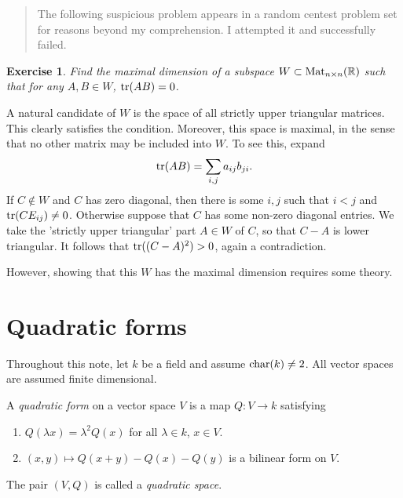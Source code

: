 \documentclass{article}
\newtheorem*{exercise}{Exercise}
\begin{document}
\self

\begin{quote}
    The following suspicious problem appears in a random centest problem set for reasons beyond my comprehension. I attempted it and successfully failed.
\end{quote}

\begin{exercise}
    Find the maximal dimension of a subspace $W\subset \operatorname{Mat}_{n\times n}(\mathbb{R})$ such that for any $A,B\in W$, $\operatorname{tr}(AB)=0$.
\end{exercise}

A natural candidate of $W$ is the space of all strictly upper triangular matrices. This clearly satisfies the condition. Moreover, this space is maximal, in the sense that no other matrix may be included into $W$. To see this, expand
\begin{equation}\label{eq.trAB}
    \operatorname{tr}(AB) = \sum_{i,j} a_{ij}b_{ji}.
\end{equation}
If $C\notin W$ and $C$ has zero diagonal, then there is some $i,j$ such that $i<j$ and $\operatorname{tr}(CE_{ij})\neq 0$. Otherwise suppose that $C$ has some non-zero diagonal entries. We take the 'strictly upper triangular' part $A\in W$ of $C$, so that $C-A$ is lower triangular. It follows that $\operatorname{tr}((C-A)^2)>0$, again a contradiction.

However, showing that this $W$ has the maximal dimension requires some theory.

\section{Quadratic forms}\label{sec.quadform}

Throughout this note, let $k$ be a field and assume $\operatorname{char}(k)\neq 2$. All vector spaces are assumed finite dimensional.

\begin{definition}
    A \emph{quadratic form} on a vector space $V$ is a map $Q:V\to k$ satisfying
    \begin{enumerate}
        \item $Q(\lambda x)=\lambda^2 Q(x)$ for all $\lambda\in k$, $x\in V$.
        \item $(x,y)\mapsto Q(x+y)-Q(x)-Q(y)$ is a bilinear form on $V$.
    \end{enumerate}
    The pair $(V,Q)$ is called a \emph{quadratic space}.
\end{definition}
\end{document}
